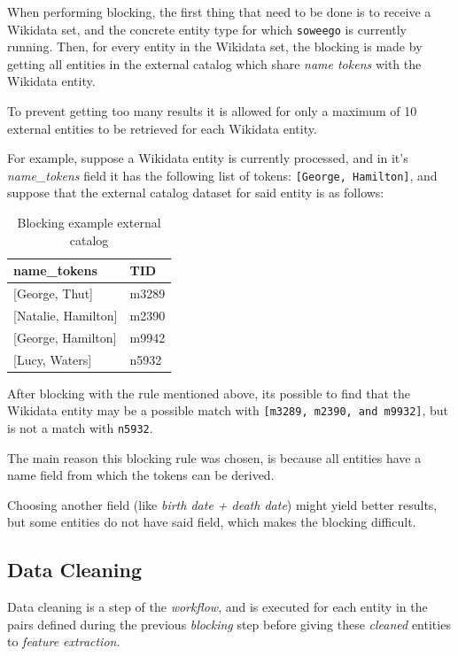 \documentclass[epsfig,a4paper,11pt,titlepage,twoside,openany]{book}
\begin{document}
When performing blocking, the first thing that need to be done is to receive a Wikidata set, and the concrete entity type for which \texttt{soweego} is currently running. Then, for every entity in the Wikidata set, the blocking is made by getting all entities in the external catalog which share \textit{name tokens} with the Wikidata entity. 

To prevent getting too many results it is allowed for only a maximum of 10 external entities to be retrieved for each Wikidata entity.

For example, suppose a Wikidata entity is  currently processed, and in it's \textit{name\_tokens} field it has the following list of tokens: \texttt{[George, Hamilton]}, and suppose that the external catalog dataset for said entity is as follows:

\begin{table}[H]
\centering
\begin{tabular}{l|l}
name\_tokens        & TID   \\ \hline
{[George, Thut]}      & m3289 \\
{[Natalie, Hamilton]} & m2390 \\
{[George, Hamilton]}  & m9942 \\
{[Lucy, Waters]}      & n5932
\end{tabular}
\caption{Blocking example external catalog}
\label{tab:soweego-blocking-ex}
\end{table}

After blocking with the rule mentioned above, its possible to find that the Wikidata entity may be a possible match with \texttt{[m3289, m2390, and m9932]}, but is not a match with \texttt{n5932}.

The main reason this blocking rule was chosen, is because all entities have a name field from which the tokens can be derived.  

Choosing another field (like \textit{birth date + death date}) might yield better results, but some entities do not have said field, which makes the blocking difficult. 

\subsection{Data Cleaning}
\label{sec:soweego-st-data-cleaning}

Data cleaning is a step of the \textit{workflow}, and is executed for each entity in the pairs defined during the previous \textit{blocking} step before giving these \textit{cleaned} entities to \textit{feature extraction}. 
\end{document}
